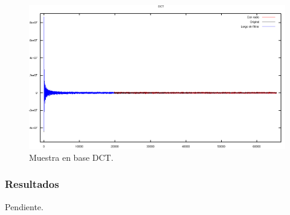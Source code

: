 \documentclass[a4paper,10pt,twoside]{article}
\begin{document}
\begin{figure}[H]
  \centering
  \includegraphics[width=15cm]{graficos/lena_impulsivo_umbralizar_dct.png} 
  \caption{Muestra en base DCT.}
\end{figure}

\subsubsection{Resultados}

Pendiente.



\end{document}
